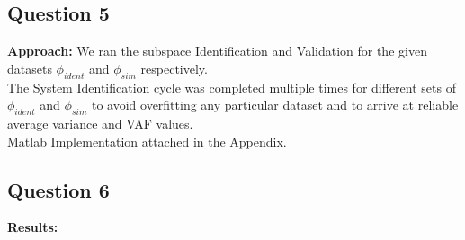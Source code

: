 \documentclass[12pt]{report}
\begin{document}
\subsection*{Question 5}
\textbf{Approach:}
We ran the subspace Identification and Validation for the given datasets $\phi_{ident}$ and $\phi_{sim}$ respectively.\\
The System Identification cycle was completed multiple times for different sets of $\phi_{ident}$ and $\phi_{sim}$ to avoid overfitting any particular dataset and to arrive at reliable average variance and VAF values.\\
Matlab Implementation attached in the Appendix.

\subsection*{Question 6}
\textbf{Results:}
\end{document}
